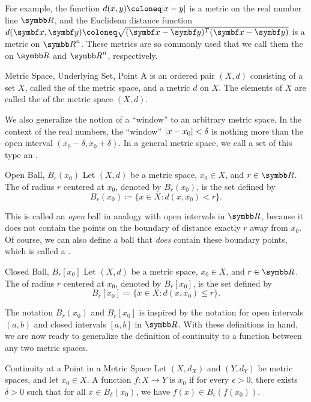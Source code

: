 \documentclass[12pt]{article}
\begin{document}
For example, the function $d(x, y) \coloneq \abs{x - y}$ is a metric on the real number line $\R$, and the Euclidean distance function $d(\vx, \vy) \coloneq \sqrt{(\vx - \vy)^T (\vx - \vy)}$ is a metric on $\R^n$. These metrics are so commonly used that we call them the  on $\R$ and $\R^n$, respectively.

\begin{dfnbox}{Metric Space, Underlying Set, Point}
	A  is an ordered pair $(X, d)$ consisting of a set $X$, called the  of the metric space, and a metric $d$ on $X$. The elements of $X$ are called the  of the metric space $(X, d)$.
\end{dfnbox}

We also generalize the notion of a ``window'' to an arbitrary metric space. In the context of the real numbers, the ``window'' ${\left\lvert {x - x_0} \right\rvert} < \delta$ is nothing more than the open interval $(x_0 - \delta, x_0 + \delta)$. In a general metric space, we call a set of this type an .

\begin{dfnbox}{Open Ball, $B_r(x_0)$}
	Let $(X, d)$ be a metric space, $x_0 \in X$, and $r \in \R$. The  of radius $r$ centered at $x_0$, denoted by $B_r(x_0)$, is the set defined by
	\[ B_r(x_0) \coloneq \{ x \in X : d(x, x_0) < r \}. \]
\end{dfnbox}

This is called an \textit{open} ball in analogy with open intervals in $\R$, because it does not contain the points on the boundary of distance exactly $r$ away from $x_0$. Of course, we can also define a ball that \textit{does} contain these boundary points, which is called a .

\begin{dfnbox}{Closed Ball, $B_r[x_0]$}
	Let $(X, d)$ be a metric space, $x_0 \in X$, and $r \in \R$. The  of radius $r$ centered at $x_0$, denoted by $B_r[x_0]$, is the set defined by
	\[ B_r[x_0] \coloneq \{ x \in X : d(x, x_0) \le r \}. \]
\end{dfnbox}

The notation $B_r(x_0)$ and $B_r[x_0]$ is inspired by the notation for open intervals $(a, b)$ and closed intervals $[a, b]$ in $\R$. With these definitions in hand, we are now ready to generalize the definition of continuity to a function between any two metric spaces.

\begin{dfnbox}{Continuity at a Point in a Metric Space}
	Let $(X, d_X)$ and $(Y, d_Y)$ be metric spaces, and let $x_0 \in X$. A function $f: X \to Y$ is  $x_0$ if for every $\epsilon > 0$, there exists $\delta > 0$ such that for all $x \in B_\delta(x_0)$, we have $f(x) \in B_\epsilon(f(x_0))$.
\end{dfnbox}
\end{document}
